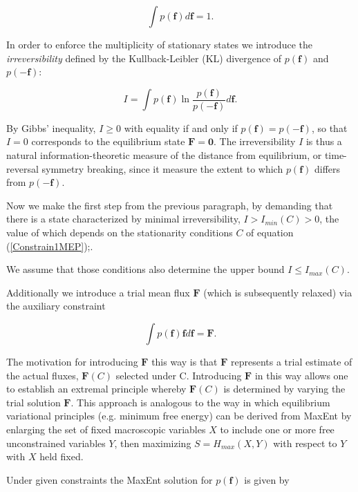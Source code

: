 \documentclass[a4paper,12pt]{article}
\begin{document}
\begin{equation}
\label{Constrain2MEP}
  \int p(\bm{f})d\bm{f} = 1.
\end{equation}

In order to enforce the multiplicity of stationary states we introduce the \textit{irreversibility} defined by the Kullback-Leibler (KL) divergence of $p(\bm{f})$ and $p(-\bm{f})$:

\begin{equation}
\label{IrreversibilityMeasure}
  I= \int p(\bm{f}) \ln \frac{p(\bm{f})}{p(-\bm{f})} d\bm{f}.
\end{equation}

By Gibbs' inequality, $I \geq 0$ with equality if and only if $p(\bm{f})=p(-\bm{f})$, so that $I=0$ corresponds to the equilibrium state $\bm{F} = \bm{0} $. The irreversibility $I$ is thus a natural information-theoretic measure of the distance from equilibrium, or time-reversal symmetry breaking, since it measure the extent to which $p(\bm{f} ) $ differs from $p(\bm{-f} ) $.

Now we make the first step from the previous paragraph, by demanding that there is a state characterized by minimal irreversibility, $I>I_{min}(C)>0$, the value of which depends on the stationarity conditions $C$ of equation (\ref{Constrain1MEP});.

We assume that those conditions also determine the upper bound $I \leq I_{max}(C)$.

Additionally we introduce a trial mean flux $\bm{F}$ (which is subsequently relaxed) via the auxiliary constraint

\begin{equation}
\label{Constrain3MEP}
  \int p(\bm{f})\bm{f} d\bm{f} = \bm{F}.
\end{equation}

The motivation for introducing $\bm{F}$ this way is that $\bm{F}$ represents a trial estimate of the actual fluxes, $\bm{F}(C)$ selected under C. Introducing $\bm{F}$ in this way allows one to establish an extremal principle whereby $\bm{F}(C)$ is determined by varying the trial solution $\bm{F}$.
This approach is analogous to the way in which equilibrium variational principles (e.g. minimum free energy) can be derived from MaxEnt by enlarging the set of fixed macroscopic variables $X$ to include one or more free unconstrained variables $Y$, then maximizing $S=H_{max}(X,Y)$ with respect to $Y$ with $X$ held fixed.

Under given constraints the MaxEnt solution for $p(\bm{f})$ is given by 
\end{document}
